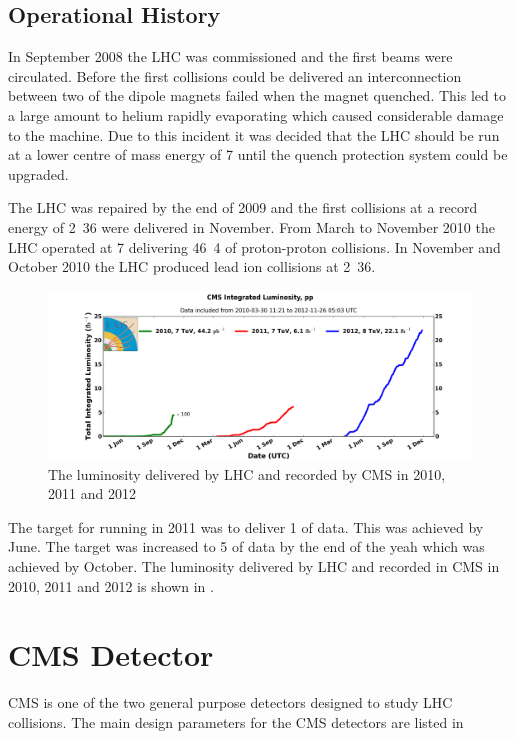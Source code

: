 \subsection{Operational History}
In September 2008 the LHC was commissioned and the first beams were circulated.
Before the first collisions could be delivered an interconnection
between two of the dipole magnets failed when the magnet quenched.
This led to a large amount to helium rapidly evaporating which caused
considerable damage to the machine.
Due to this incident it was decided that the LHC should be run at a lower centre
of mass energy of \unit{7}{\TeV} until the quench protection system could be
upgraded.

The LHC was repaired by the end of 2009 and the first collisions at a record
energy of \unit{2.36}{\TeV} were delivered in November. 
From March to November 2010 the LHC operated at \unit{7}{\TeV} delivering
\unit{46.4}{\invpb} of proton-proton collisions.
In November and October 2010 the LHC produced lead ion collisions at
\unit{2.36}{\TeV}.

\begin{figure}[htbp]
  \centering
  \includegraphics[width=\textwidth]{int_lumi_cumulative_pp_1.png}
  \caption{The luminosity delivered by LHC and recorded by CMS in 2010, 2011 and 2012}
  \label{fig:LHC2010}
\end{figure}


The target for running in 2011 was to deliver \unit{1}{\invfb} of data. This was
achieved by June. The target was increased to \unit{5}{\invfb} of data by the end
of the yeah which was achieved by October.
The luminosity delivered by LHC and recorded in CMS in 2010, 2011 and 2012 is
shown in .

\section{CMS Detector}
\ac{CMS} is one of the two general purpose
detectors designed to study LHC collisions. The main design parameters for the
\ac{CMS} detectors  are listed in 

